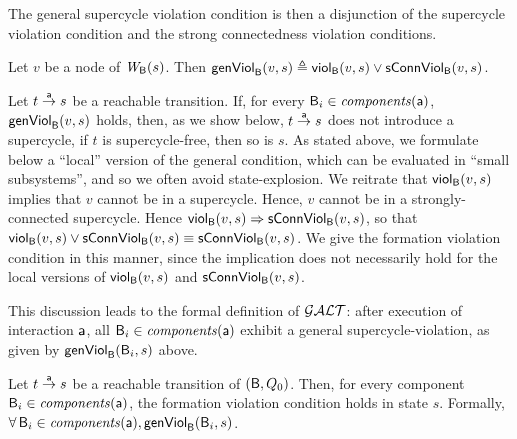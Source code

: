 The general supercycle violation condition is then a disjunction of the supercycle violation condition
and the strong connectedness violation conditions.


\begin{definition}
\label{def:formation.violation} 
\label{defn:formation.violation} 
Let $v$ be a node of $\wfg{\B}{s}$.
Then 
$\genViol{v}{s}  \df \scV{v}{s}  \lor \connViol{v}{s}$.
\end{definition}
%
Let $t \goesto[\act] s$ be a reachable transition. If, for every $\B_i \in \cmps{\act}$, $\formViol{v}{s}$ holds, then, as we show below,
$t \goesto[\act] s$ does not introduce a supercycle, \ie if $t$ is supercycle-free, then so is $s$. As stated above, we formulate below a ``local''
version of the general condition, which can be evaluated in ``small subsystems'', and so we often avoid state-explosion.
We reitrate that $\scV{v}{s}$ implies that $v$ cannot be in a supercycle. Hence, $v$ cannot be in a strongly-connected supercycle.
Hence $\scV{v}{s} \imp \connViol{v}{s}$, so that 
$\scV{v}{s}  \lor \connViol{v}{s} \ev  \connViol{v}{s}$.
We give the formation violation condition in this manner, since 
the implication does not necessarily hold for the local versions of $\scV{v}{s}$ and $\connViol{v}{s}$.

This discussion leads to the formal definition of $\GAO$: 
after execution of interaction $\act$, all $\B_i \in \cmps{\act}$ exhibit a general supercycle-violation, as given by $\genViol{\B_i}{s}$ above.

\begin{definition} \label{def:global.ANDOR-cond} \label{defn:global.ANDOR-cond} 
Let $t \goesto[\act] s$ be a reachable transition of $(\B, Q_0)$.
Then, for every component $\B_i \in \comps{\act}$, the formation violation condition holds in state $s$.
Formally,\\
\ind  $\fas \B_i \in \comps{\act}, \genViol{\B_i}{s}$.
\end{definition}


